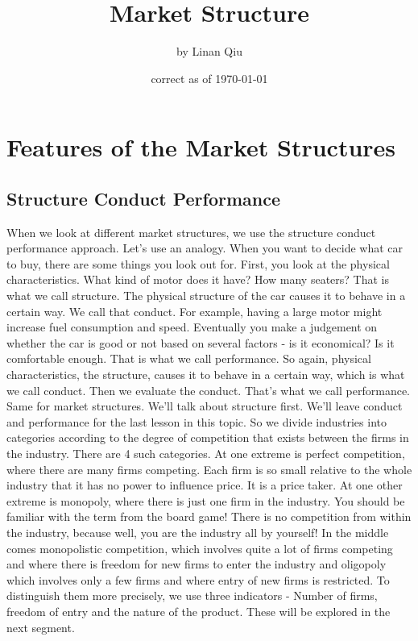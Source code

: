 \documentclass[DIV=calc,11pt,parskip,numbers=noenddot]{scrartcl} %
\title{Market Structure}
\author{\large by Linan Qiu}
\date{\small correct as of \today}
\begin{document}
\maketitle
\tableofcontents
\section{Features of the Market Structures}
\subsection{Structure Conduct Performance}
When we look at different market structures, we use the structure conduct performance approach. Let’s use an analogy. When you want to decide what car to buy, there are some things you look out for. First, you look at the physical characteristics. What kind of motor does it have? How many seaters? That is what we call structure. The physical structure of the car causes it to behave in a certain way. We call that conduct. For example, having a large motor might increase fuel consumption and speed. Eventually you make a judgement on whether the car is good or not based on several factors - is it economical? Is it comfortable enough. That is what we call performance. So again, physical characteristics, the structure, causes it to behave in a certain way, which is what we call conduct. Then we evaluate the conduct. That’s what we call performance. Same for market structures. We’ll talk about structure first. We’ll leave conduct and performance for the last lesson in this topic. So we divide industries into categories according to the degree of competition that exists between the firms in the industry. There are 4 such categories. At one extreme is perfect competition, where there are many firms competing. Each firm is so small relative to the whole industry that it has no power to influence price. It is a price taker. At one other extreme is monopoly, where there is just one firm in the industry. You should be familiar with the term from the board game! There is no competition from within the industry, because well, you are the industry all by yourself! In the middle comes monopolistic competition, which involves quite a lot of firms competing and where there is freedom for new firms to enter the industry and oligopoly which involves only a few firms and where entry of new firms is restricted. To distinguish them more precisely, we use three indicators - Number of firms, freedom of entry and the nature of the product. These will be explored in the next segment.
\end{document}
